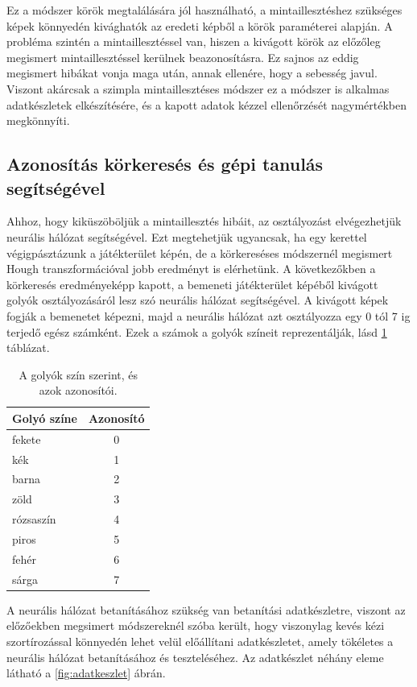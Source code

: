 \par Ez a módszer körök megtalálására jól használható, a mintaillesztéshez szükséges képek könnyedén kivághatók az eredeti képből a körök paraméterei alapján. A probléma szintén a mintaillesztéssel van, hiszen a kivágott körök az előzőleg megismert mintaillesztéssel kerülnek beazonosításra. Ez sajnos az eddig megismert hibákat vonja maga után, annak ellenére, hogy a sebesség javul. Viszont akárcsak a szimpla mintaillesztéses módszer ez a módszer is alkalmas adatkészletek elkészítésére, és a kapott adatok kézzel ellenőrzését nagymértékben megkönnyíti.

\subsection{Azonosítás körkeresés és gépi tanulás segítségével}
Ahhoz, hogy kiküszöböljük a mintaillesztés hibáit, az osztályozást elvégezhetjük neurális hálózat segítségével. Ezt megtehetjük ugyancsak, ha egy kerettel végigpásztázunk a játékterület képén, de a körkereséses módszernél megismert Hough transzformációval jobb eredményt is elérhetünk. A következőkben a körkeresés eredményeképp kapott, a bemeneti játékterület képéből kivágott golyók osztályozásáról lesz szó neurális hálózat segítségével. A kivágott képek fogják a bemenetet képezni, majd a neurális hálózat azt osztályozza egy 0 tól 7 ig terjedő egész számként. Ezek a számok a golyók színeit reprezentálják, lásd \ref{tab:golyo_azonositok} táblázat.

\begin{table}[!ht]
    \caption{A golyók szín szerint, és azok azonosítói.}
    \label{tab:golyo_azonositok}
	\footnotesize
	\centering
	\begin{tabular}{ l c }
		\toprule
		Golyó színe & Azonosító \\
		\midrule
		fekete      & 0\\
        kék         & 1\\
        barna       & 2\\
        zöld        & 3\\
        rózsaszín   & 4\\
        piros       & 5\\
        fehér       & 6\\
        sárga       & 7\\
		\bottomrule
	\end{tabular}
\end{table}

\par A neurális hálózat betanításához szükség van betanítási adatkészletre, viszont az előzőekben megsimert módszereknél szóba került, hogy viszonylag kevés kézi szortírozással könnyedén lehet velül előállítani adatkészletet, amely tökéletes a neurális hálózat betanításához és teszteléséhez. Az adatkészlet néhány eleme látható a \ref{fig:adatkeszlet} ábrán.

